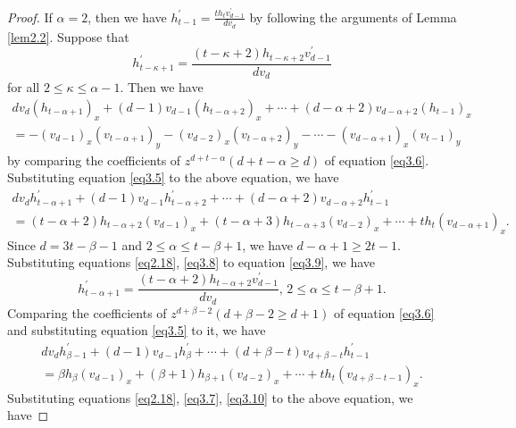 \documentclass[12pt, twoside, leqno]{article}
\theoremstyle{definition}
\numberwithin{equation}{section}
\begin{document}
\begin{proof}
If $\alpha=2$, then we have $h_{t-1}^{'}=\frac{th_{t}v_{d-1}^{'}}{dv_{d}}$ by following the arguments of Lemma \ref{lem2.2}. Suppose that
\begin{equation}\label{eq3.8}
h_{t-\kappa+1}^{'}=\dfrac{(t-\kappa+2)h_{t-\kappa+2}v_{d-1}^{'}}{dv_{d}}
\end{equation}
for all $2\leq\kappa\leq\alpha-1$. Then we have
\begin{equation}\nonumber
\begin{split}
dv_{d}(h_{t-\alpha+1})_x+(d-1)v_{d-1}(h_{t-\alpha+2})_x+\cdots+(d-\alpha+2)v_{d-\alpha+2}(h_{t-1})_x\\=-(v_{d-1})_x(v_{t-\alpha+1})_y-(v_{d-2})_x(v_{t-\alpha+2})_y-\cdots-(v_{d-\alpha+1})_x(v_{t-1})_y
\end{split}
\end{equation}
by comparing the coefficients of $z^{d+t-\alpha}$$(d+t-\alpha\geq d)$ of equation \eqref{eq3.6}. Substituting equation \eqref{eq3.5} to the above equation, we have
\begin{equation}\label{eq3.9}
\begin{split}
dv_{d}h_{t-\alpha+1}^{'}+(d-1)v_{d-1}h_{t-\alpha+2}^{'}+\cdots+(d-\alpha+2)v_{d-\alpha+2}h_{t-1}^{'}\\
=(t-\alpha+2)h_{t-\alpha+2}(v_{d-1})_x+(t-\alpha+3)h_{t-\alpha+3}(v_{d-2})_x+\cdots+th_{t}(v_{d-\alpha+1})_x.
\end{split}
\end{equation}
Since $d=3t-\beta-1$ and $2\leq\alpha\leq t-\beta+1$, we have $d-\alpha+1\geq 2t-1$. Substituting equations \eqref{eq2.18}, \eqref{eq3.8} to equation \eqref{eq3.9}, we have
\begin{equation}\label{eq3.10}
h_{t-\alpha+1}^{'}=\frac{(t-\alpha+2)h_{t-\alpha+2}v_{d-1}^{'}}{dv_{d}},\,2\leq\alpha\leq t-\beta+1.
\end{equation}
Comparing the coefficients of $z^{d+\beta-2}$$(d+\beta-2\geq d+1)$ of equation \eqref{eq3.6} and substituting equation \eqref{eq3.5} to it, we have
\begin{equation}\nonumber
\begin{split}
dv_{d}h_{\beta-1}^{'}+(d-1)v_{d-1}h_{\beta}^{'}+\cdots+(d+\beta-t)v_{d+\beta-t}h_{t-1}^{'}
\\=\beta h_{\beta}(v_{d-1})_x+(\beta+1)h_{\beta+1}(v_{d-2})_x+\cdots+th_{t}(v_{d+\beta-t-1})_x.
\end{split}
\end{equation}
Substituting equations \eqref{eq2.18}, \eqref{eq3.7}, \eqref{eq3.10} to the above equation, we have

\end{proof}
\end{document}
